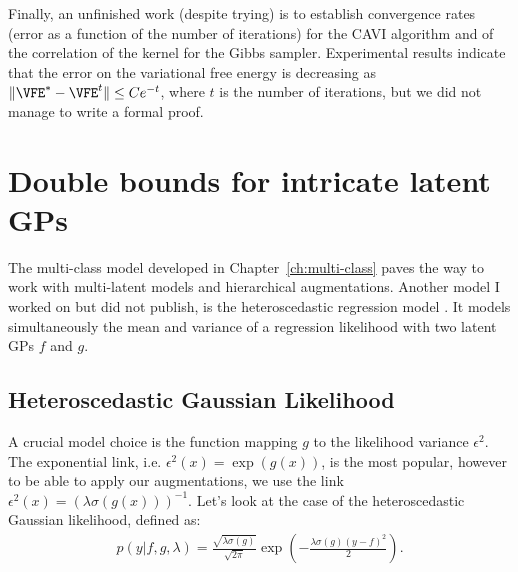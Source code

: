 Finally, an unfinished work (despite trying) is to establish convergence rates (error as a function of the number of iterations) for the \ac{CAVI} algorithm and of the correlation of the kernel for the Gibbs sampler.
Experimental results indicate that the error on the variational free energy is decreasing as $\|\VFE^{*} - \VFE^{t}\|\leq C e^{-t}$, where $t$ is the number of iterations, but we did not manage to write a formal proof.


\section{Double bounds for intricate latent GPs}
\label{sec:heteroscedastic}
The multi-class model developed in Chapter~\ref{ch:multi-class} paves the way to work with multi-latent models and hierarchical augmentations.
Another model I worked on but did not publish, is the heteroscedastic regression model \cite{wangGaussianProcessRegression2012,lazaro2011variational}.
It models simultaneously the mean and variance of a regression likelihood with two latent \ac{GPs} $f$ and $g$.

\subsection{Heteroscedastic Gaussian Likelihood}

A crucial model choice is the function mapping $g$ to the likelihood variance $\epsilon^2$.
The exponential link, i.e. $\epsilon^2(x) = \exp(g(x))$, is the most popular, however to be able to apply our augmentations, we use the link $\epsilon^2(x) = \left(\lambda \sigma(g(x))\right)^{-1}$.
Let's look at the case of the heteroscedastic Gaussian likelihood, defined as:
\begin{align}
    p(y|f,g,\lambda) = \frac{\sqrt{\lambda \sigma(g)}}{\sqrt{2\pi}}\exp\left(-\frac{\lambda \sigma(g)(y-f)^2}{2}\right).\label{eq:hetero_lik}
\end{align}

